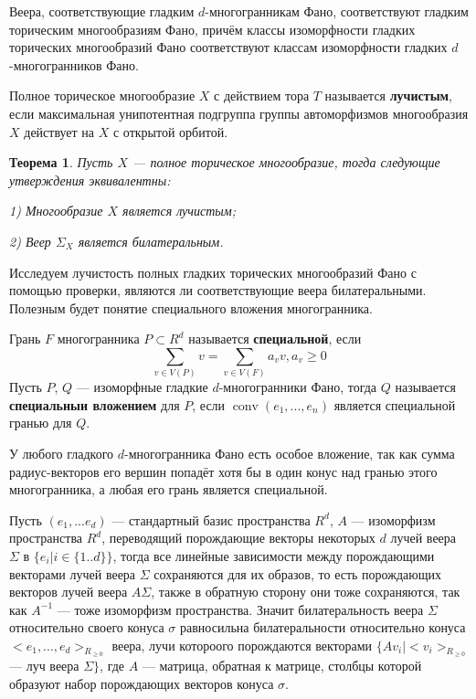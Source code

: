 \documentclass[12pt,notitlepage]{article}
\DeclareMathOperator{\conv}{conv}
\newtheorem{theorem}{Теорема}
\begin{document}
	Веера, соответствующие гладким $d$-многогранникам Фано, соответствуют гладким торическим многообразиям Фано, причём классы изоморфности гладких торических многообразий Фано соответствуют классам изоморфности гладких $d$-многогранников Фано.
	
	Полное торическое многообразие $X$  с действием тора $T$ называется \textbf{лучистым}, если максимальная унипотентная подгруппа группы автоморфизмов  многообразия $X$ действует на $X$ с открытой орбитой.
	
	\begin{theorem}
	Пусть $X$ --- полное торическое многообразие, тогда следующие утверждения эквивалентны:
	
	1) Многообразие $X$ является лучистым;
	
	2) Веер $\Sigma_X$ является билатеральным.
	\end{theorem}
	
	Исследуем лучистость полных гладких торических многообразий Фано с помощью проверки, являются ли соответствующие веера билатеральными. Полезным будет понятие специального вложения многогранника.
	
	Грань $F$ многогранника $P \subset R^d$ называется \textbf{специальной}, если
		\[
		\sum_{v \in V(P)} v = \sum_{v \in V(F)} a_v v, a_v \geq 0
		\] 
	Пусть $P$, $Q$ --- изоморфные гладкие $d$-многогранники Фано, тогда $Q$ называется \textbf{специальныи вложением} для $P$, если $\conv (e_1, ..., e_n)$ является специальной гранью для $Q$.
	
	У любого гладкого $d$-многогранника Фано есть особое вложение, так как сумма радиус-векторов его вершин попадёт хотя бы в один конус над гранью этого многогранника, а любая его грань является специальной.
	
	Пусть $(e_1, ... e_d)$ --- стандартный базис пространства $R^d$, $A$ --- изоморфизм пространства $R^d$, переводящий порождающие векторы некоторых $d$ лучей веера $\Sigma$ в $\{e_i | i \in \{1 .. d\}\}$, тогда все линейные зависимости между порождающими векторами лучей веера $\Sigma$ сохраняются для их образов, то есть порождающих векторов лучей веера $A \Sigma$, также в обратную сторону они тоже сохраняются, так как $A^{-1}$ --- тоже изоморфизм пространства. Значит билатеральность веера $\Sigma$ относительно своего конуса $\sigma$ равносильна билатеральности относительно конуса $<e_1, ..., e_d>_{R_{\geq 0}}$ веера, лучи котороого порождаются векторами $\{A v_i | <v_i>_{R_{\geq 0}}$ --- луч веера $\Sigma \}$, где $A$ --- матрица, обратная к матрице, столбцы которой образуют набор порождающих векторов конуса $\sigma$.
	
\end{document}
